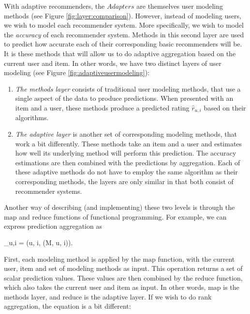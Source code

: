 With adaptive recommenders, the $Adapters$ are themselves user modeling methods 
(see Figure \ref{fig:layer:comparison}).
However, instead of modeling users, we wish to model each recommender system.
More specifically, we wish to model the \emph{accuracy} of each recommender system.
Methods in this second layer are used to predict how accurate each of their corresponding basic recommenders will be.
It is these methods that will allow us to do adaptive aggregation based on the current user and item.
In other words, we have two distinct layers of user modeling 
(see Figure \ref{fig:adaptiveusermodeling}):



\begin{enumerate}
  \item
    \emph{The methods layer} consists of traditional user modeling methods, that use a single aspect of the data to produce predictions.
    When presented with an item and a user, these methods produce a predicted rating $\hat{r}_{u,i}$ based on their algorithms.
  \item
    \emph{The adaptive layer} is another set of corresponding modeling methods, that work a bit differently.
    These methods take an item and a user and estimates how well its underlying method will perform this prediction.
    The accuracy estimations are then combined with the predictions by aggregation.
    Each of these adaptive methods do not have to employ the same algorithm as their corresponding methods,
    the layers are only similar in that both consist of recommender systems.
\end{enumerate}

Another way of describing (and implementing) these two levels is through 
the $\mathrm{map}$ and $\mathrm{reduce}$ functions of functional programming.
For example, we can express prediction aggregation as 

\begin{eqsp}
  _{u,i} = (u, i, (M, u, i)).
\end{eqsp}
%
First, each modeling method is applied by the $\mathrm{map}$ function, with the current user, item and set of modeling methods as input.
This operation returns a set of scalar prediction values. 
These values are then combined by the $\mathrm{reduce}$ function, which also takes the current user and item as input.
In other words, $\mathrm{map}$ is the methods layer, and $\mathrm{reduce}$ is the adaptive layer.
If we wish to do rank aggregation, the equation is a bit different:

